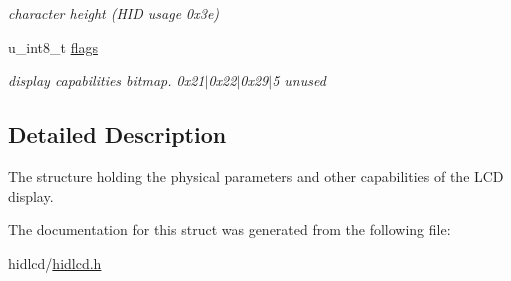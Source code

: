 \begin{DoxyCompactItemize}
\begin{DoxyCompactList}\small\item\em character height (H\+ID usage 0x3e) \end{DoxyCompactList}\item 
\mbox{\label{structHIDDisplayParams_a479140910bf7dc245c262026026a641f}} 
u\+\_\+int8\+\_\+t \hyperlink{structHIDDisplayParams_a479140910bf7dc245c262026026a641f}{flags}
\begin{DoxyCompactList}\small\item\em display capabilities bitmap. 0x21$\vert$0x22$\vert$0x29$\vert$5 unused \end{DoxyCompactList}\end{DoxyCompactItemize}


\subsection{Detailed Description}
The structure holding the physical parameters and other capabilities of the L\+CD display. 

The documentation for this struct was generated from the following file\+:\begin{DoxyCompactItemize}
\item 
hidlcd/\hyperlink{hidlcd_8h}{hidlcd.\+h}\end{DoxyCompactItemize}
